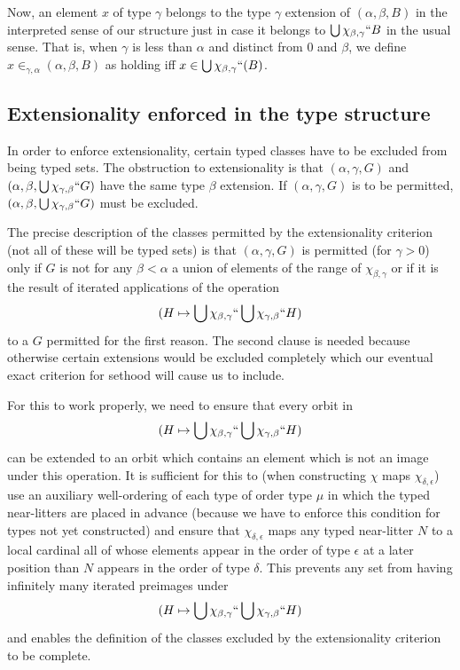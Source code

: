 \documentclass[12pt]{article}
\begin{document}
Now, an element $x$ of type $\gamma$ belongs to the type $\gamma$ extension of $(\alpha,\beta,B)$ in the interpreted sense of our structure just in case it belongs to $\bigcup \chi_{\beta,\gamma}``B$ in the usual sense.  That is, when $\gamma$ is less than $\alpha$ and distinct from 0 and
$\beta$, we define $x \in_{\gamma,\alpha} (\alpha,\beta,B)$ as holding iff $x \in \bigcup \chi_{\beta,\gamma}``(B)$.

\subsection{Extensionality enforced in the type structure}

In order to enforce extensionality, certain typed classes have to be excluded from being typed sets.  The obstruction to extensionality is that $(\alpha,\gamma,G)$ and $(\alpha,\beta,\bigcup \chi_{\gamma,\beta}``G)$ have the same type $\beta$ extension.  If $(\alpha,\gamma,G)$ is to be permitted,
$(\alpha,\beta,\bigcup \chi_{\gamma,\beta}``G)$ must be excluded.

The precise description of the classes permitted by the extensionality criterion (not all of these will be typed sets) is that  $(\alpha,\gamma,G)$  is permitted (for $\gamma>0$) only if $G$ is not for any $\beta<\alpha$ a union of elements of the range of $\chi_{\beta,\gamma}$ or if it is the result of iterated applications of the operation $$(H \mapsto \bigcup\chi_{\beta,\gamma}``\bigcup\chi_{\gamma,\beta}``H)$$
to a $G$ permitted for the first reason.  The second clause is needed because otherwise certain extensions would be excluded completely which our eventual exact criterion for sethood will cause us to include.

For this to work properly, we need to ensure that every orbit in $$(H \mapsto \bigcup\chi_{\beta,\gamma}``\bigcup\chi_{\gamma,\beta}``H)$$ can be extended to an orbit which contains an element which is not an image under this operation.  It is sufficient for this to (when constructing $\chi$ maps $\chi_{\delta,\epsilon}$) use an auxiliary well-ordering of each type of order type $\mu$ in which the typed near-litters are placed in advance
(because we have to enforce this condition for types not yet constructed) and ensure that $\chi_{\delta,\epsilon}$ maps any typed near-litter $N$ to a local cardinal all of whose elements appear in the order of type $\epsilon$  at a later position than $N$ appears in the order of type $\delta$.  This prevents any set from having infinitely many iterated preimages under 
 $$(H \mapsto \bigcup\chi_{\beta,\gamma}``\bigcup\chi_{\gamma,\beta}``H)$$ and enables the definition of the classes excluded by the extensionality criterion to be complete.
\end{document}
